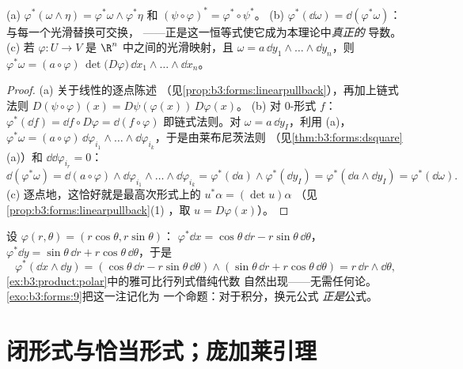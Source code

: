 \begin{theorem}\label{thm:b3:forms:pullback}
(a) $\varphi^*(\omega \wedge \eta) = \varphi^*\omega \wedge
\varphi^*\eta$ 和 $(\psi \circ \varphi)^* = \varphi^* \circ
\psi^*$。
(b) $\varphi^*(\dd\omega) = \dd(\varphi^*\omega)$：
与每一个光滑替换可交换，
——正是这一恒等式使它成为本理论中\emph{真正的}
导数。
(c) 若 $\varphi\colon U \to V$ 是
$\R^n$ 中之间的光滑映射，且 $\omega = a\,\dd y_1 \wedge \dots \wedge \dd
y_n$，则 $\varphi^*\omega = (a \circ
\varphi)\,\det\bigl(D\varphi\bigr)\,\dd x_1 \wedge \dots
\wedge \dd x_n$。
\end{theorem}

\begin{proof}
(a) 关于线性的逐点陈述
（见\cref{prop:b3:forms:linearpullback}），再加上链式法则
$D(\psi\circ\varphi)(x) = D\psi(\varphi(x))\,D\varphi(x)$。
(b) 对 $0$-形式 $f$：$\varphi^*(\dd f) = \dd f \circ
D\varphi = \dd(f \circ \varphi)$ 即链式法则。对
$\omega = a\,\dd y_I$，利用 (a)，$\varphi^*\omega =
(a\circ\varphi)\,\dd\varphi_{i_1}\wedge\dots\wedge
\dd\varphi_{i_k}$，于是由莱布尼茨法则
（见\cref{thm:b3:forms:dsquare}(a)）和 $\dd\dd\varphi_{i_r} =
0$：
\[
\dd(\varphi^*\omega) = \dd(a\circ\varphi) \wedge
\dd\varphi_{i_1}\wedge\dots\wedge\dd\varphi_{i_k}
= \varphi^*(\dd a) \wedge \varphi^*(\dd y_I)
= \varphi^*(\dd a \wedge \dd y_I) =
\varphi^*(\dd\omega).
\]
(c) 逐点地，这恰好就是最高次形式上的 $u^*\alpha = (\det u)\alpha$
（见\cref{prop:b3:forms:linearpullback}(1)
，取 $u = D\varphi(x)$）。
\end{proof}

\begin{example}[极坐标]\label{ex:b3:forms:polar}
设 $\varphi(r, \theta) = (r\cos\theta, r\sin\theta)$：
$\varphi^*\dd x = \cos\theta\,\dd r -
r\sin\theta\,\dd\theta$，$\varphi^*\dd y = \sin\theta\,\dd r
+ r\cos\theta\,\dd\theta$，于是
\[
\varphi^*(\dd x \wedge \dd y) =
(\cos\theta\,\dd r - r\sin\theta\,\dd\theta) \wedge
(\sin\theta\,\dd r + r\cos\theta\,\dd\theta)
= r\,\dd r \wedge \dd\theta,
\]
\cref{ex:b3:product:polar}中的雅可比行列式借纯代数
自然出现——无需任何论。\cref{exo:b3:forms:9}把这一注记化为
一个命题：对于积分，换元公式
\emph{正是}公式。
\end{example}

\section{闭形式与恰当形式；庞加莱引理}

